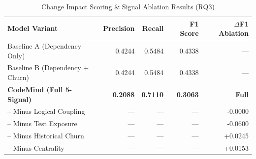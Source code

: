 \begin{table}[htbp]
\caption{Change Impact Scoring & Signal Ablation Results (RQ3)}
\label{tab:impact_scoring}
\centering
\begin{tabular}{lrrrr}
\hline
\textbf{Model Variant} & \textbf{Precision} & \textbf{Recall} & \textbf{F1 Score} & \textbf{$\Delta$F1 Ablation} \\
\hline
Baseline A (Dependency Only) & 0.4244 & 0.5484 & 0.4338 & --- \\
Baseline B (Dependency + Churn) & 0.4244 & 0.5484 & 0.4338 & --- \\
\textbf{CodeMind (Full 5-Signal)} & \textbf{0.2088} & \textbf{0.7110} & \textbf{0.3063} & \textbf{Full} \\
\quad -- Minus Logical Coupling & --- & --- & --- & -0.0000 \\
\quad -- Minus Test Exposure & --- & --- & --- & -0.0600 \\
\quad -- Minus Historical Churn & --- & --- & --- & +0.0245 \\
\quad -- Minus Centrality & --- & --- & --- & +0.0153 \\
\hline
\end{tabular}
\end{table}
